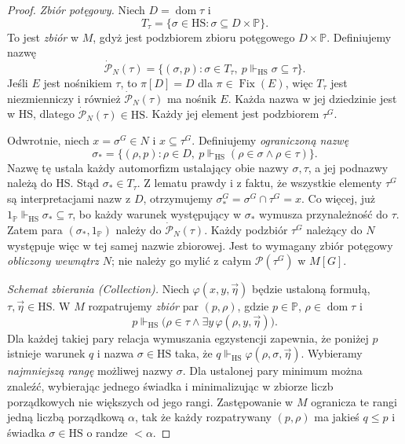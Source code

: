 \begin{proof}
\emph{Zbiór potęgowy.}
Niech $D=\operatorname{dom}\tau$ i
\[
 T_\tau=
 \{\sigma\in\mathrm{HS}:
       \sigma\subseteq D\times\mathbb P\}.
\]
To jest \emph{zbiór} w $M$,
gdyż jest podzbiorem zbioru
potęgowego $D\times\mathbb P$.
Definiujemy nazwę
\[
 \dot{\mathcal P}_N(\tau)=
 \{(\sigma,p):\sigma\in T_\tau,\
              p\Vdash_{\mathrm{HS}}
                  \sigma\subseteq\tau\}.
\]
Jeśli $E$ jest nośnikiem $\tau$,
to $\pi[D]=D$ dla $\pi\in\operatorname{Fix}(E)$,
więc $T_\tau$ jest niezmienniczy
i również $\dot{\mathcal P}_N(\tau)$
ma nośnik $E$. Każda nazwa w jej
dziedzinie jest w HS, dlatego
$\dot{\mathcal P}_N(\tau)\in\mathrm{HS}$.
Każdy jej element jest podzbiorem $\tau^G$.

Odwrotnie, niech $x=\sigma^G\in N$
i $x\subseteq\tau^G$.
Definiujemy \emph{ograniczoną nazwę}
\[
 \sigma_*=
 \{(\rho,p):\rho\in D,\
   p\Vdash_{\mathrm{HS}}
    (\rho\in\sigma\land\rho\in\tau)\}.
\]
Nazwę tę ustala każdy automorfizm
ustalający obie nazwy $\sigma,\tau$,
a jej podnazwy należą do HS.
Stąd $\sigma_*\in T_\tau$.
Z lematu prawdy i z faktu,
że wszystkie elementy $\tau^G$
są interpretacjami nazw z $D$,
otrzymujemy
$\sigma_*^G=\sigma^G\cap\tau^G=x$.
Co więcej, już
$1_{\mathbb P}\Vdash_{\mathrm{HS}}
 \sigma_*\subseteq\tau$,
bo każdy warunek występujący w
$\sigma_*$ wymusza przynależność do $\tau$.
Zatem para
$(\sigma_*,1_{\mathbb P})$ należy do
$\dot{\mathcal P}_N(\tau)$.
Każdy podzbiór $\tau^G$ należący
do $N$ występuje więc w tej samej
nazwie zbiorowej. Jest to wymagany
zbiór potęgowy \emph{obliczony wewnątrz $N$};
nie należy go mylić z całym
$\mathcal P(\tau^G)$ w $M[G]$.

\emph{Schemat zbierania (Collection).}
Niech $\varphi(x,y,\vec\eta)$ będzie
ustaloną formułą, $\tau,\vec\eta\in\mathrm{HS}$.
W $M$ rozpatrujemy \emph{zbiór} par
$(p,\rho)$, gdzie $p\in\mathbb P$,
$\rho\in\operatorname{dom}\tau$ i
\[
 p\Vdash_{\mathrm{HS}}
   \bigl(\rho\in\tau\land
          \exists y\,\varphi(\rho,y,\vec\eta)\bigr).
\]
Dla każdej takiej pary relacja
wymuszania egzystencji zapewnia,
że poniżej $p$ istnieje warunek $q$
i nazwa $\sigma\in\mathrm{HS}$ taka, że
$q\Vdash_{\mathrm{HS}}\varphi(\rho,\sigma,\vec\eta)$.
Wybieramy \emph{najmniejszą rangę}
możliwej nazwy $\sigma$.
Dla ustalonej pary minimum można
znaleźć, wybierając jednego świadka
i minimalizując w zbiorze liczb
porządkowych nie większych od jego rangi.
Zastępowanie w $M$ ogranicza te rangi
jedną liczbą porządkową $\alpha$,
tak że każdy rozpatrywany $(p,\rho)$
ma jakieś $q\le p$ i świadka
$\sigma\in\mathrm{HS}$ o randze $<\alpha$.


\end{proof}
